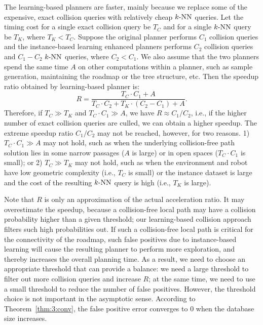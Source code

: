 The learning-based planners are faster, mainly because we replace some of the expensive, exact collision queries with relatively cheap $k\text{-NN}$ queries. Let the timing cost for a single exact collision query be $T_C$ and for a single $k\text{-NN}$ query be $T_K$, where $T_K < T_C$. Suppose the original planner performs $C_1$ collision queries and the instance-based learning enhanced planners performs $C_2$ collision queries and $C_1 - C_2$ $k\text{-NN}$ queries, where $C_2 < C_1$. We also assume that the two planners spend the same time $A$ on other computations within a planner, such as sample generation, maintaining the roadmap or the tree structure, etc. Then the speedup ratio obtained by learning-based planner is:
\begin{equation}
  R = \frac{T_C \cdot C_1 + A}{T_C \cdot C_2 + T_K \cdot (C_2 - C_1) + A}.
\end{equation}
Therefore, if $T_C \gg T_K$ and $T_C \cdot C_1 \gg A$, we have $R \approx C_1 / C_2$, i.e., if the higher number of exact collision queries are culled, we can obtain a higher speedup. The extreme speedup ratio $C_1 / C_2$ may not be reached, however, for two reasons. 1) $T_C \cdot C_1 \gg A$ may not hold, such as when the underlying collision-free path solution lies in some narrow passages ($A$ is large) or in open spaces ($T_C \cdot C_1$ is small); or 2) $T_C \gg T_K$ may not hold, such as when the environment and robot have low geometric complexity (i.e., $T_C$ is small) or the instance dataset is large and the cost of the resulting $k\text{-NN}$ query is high (i.e., $T_K$ is large).

Note that $R$ is only an approximation of the actual acceleration ratio. It may overestimate the speedup, because a collision-free local path may have a collision probability higher than a given threshold; our learning-based collision approach filters such high probabilities out. If such a collision-free local path is critical for
the connectivity of the roadmap, such false positives due to instance-based learning will cause the resulting planner to perform more exploration, and thereby increases the overall planning time. As a result, we need to choose an appropriate threshold that can provide a balance: we need a large threshold to filter out more collision queries and increase $R$; at the same time, we need to use a small threshold to reduce the number of false positives. However, the threshold choice is not important in the asymptotic sense. According to Theorem~\ref{thm:3:conv}, the false positive error converges to $0$ when the database size increases.

